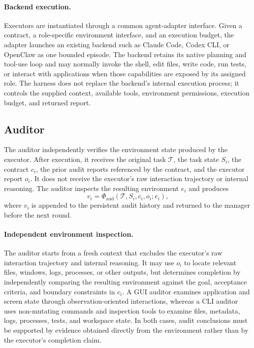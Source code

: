 \paragraph{Backend execution.}
Executors are instantiated through a common agent-adapter interface.
Given a contract, a role-specific environment interface, and an
execution budget, the adapter launches an existing backend such as
Claude Code, Codex CLI, or OpenClaw as one bounded episode. The backend
retains its native planning and tool-use loop and may normally invoke
the shell, edit files, write code, run tests, or interact with
applications when those capabilities are exposed by its assigned role.
The harness does not replace the backend's internal execution process;
it controls the supplied context, available tools, environment
permissions, execution budget, and returned report.


\subsection{Auditor}
\label{sec:method:auditor}

The auditor independently verifies the environment state produced by
the executor. After execution, it receives the original task
$\mathcal{T}$, the task state $S_i$, the contract $c_i$, the prior
audit reports referenced by the contract, and the executor report
$o_i$. It does not receive the executor's raw interaction trajectory or
internal reasoning. The auditor inspects the resulting environment
$e_i$ and produces
\begin{equation}
\label{eq:auditor}
v_i
=
\Phi_{\mathrm{aud}}
\left(
\mathcal{T},
S_i,
c_i,
o_i;
e_i
\right),
\end{equation}
where $v_i$ is appended to the persistent audit history and returned to
the manager before the next round.

\paragraph{Independent environment inspection.}
The auditor starts from a fresh context that excludes the executor's
raw interaction trajectory and internal reasoning. It may use $o_i$ to
locate relevant files, windows, logs, processes, or other outputs, but
determines completion by independently comparing the resulting
environment against the goal, acceptance criteria, and boundary
constraints in $c_i$. A GUI auditor examines application and screen
state through observation-oriented interactions, whereas a CLI auditor
uses non-mutating commands and inspection tools to examine files,
metadata, logs, processes, tests, and workspace state. In both cases,
audit conclusions must be supported by evidence obtained directly from
the environment rather than by the executor's completion claim.

